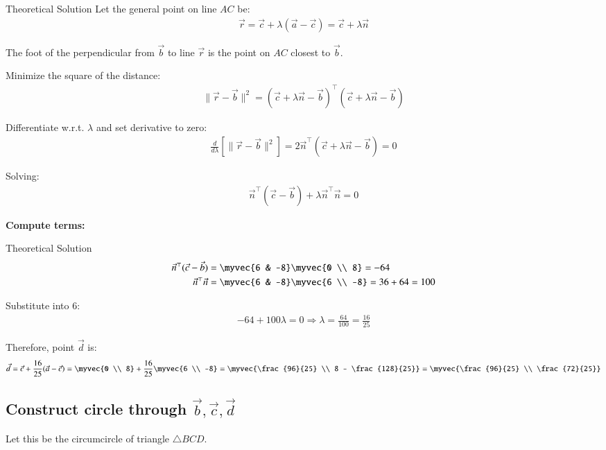 \documentclass{beamer}
\begin{document}
\begin{frame}{Theoretical Solution}
Let the general point on line \(AC\) be:
\begin{align}
\vec{r} = \vec{c} + \lambda(\vec{a} - \vec{c}) = \vec{c} + \lambda \vec{n} \label{3}
\end{align}

The foot of the perpendicular from \( \vec{b} \) to line \( \vec{r} \) is the point on \(AC\) closest to \(\vec{b}\).

Minimize the square of the distance:
\begin{align}
\| \vec{r} - \vec{b} \|^2 = (\vec{c} + \lambda \vec{n} - \vec{b})^\top (\vec{c} + \lambda \vec{n} - \vec{b}) \label{4}
\end{align}

Differentiate w.r.t. \(\lambda\) and set derivative to zero:
\begin{align}
\frac{d}{d\lambda} \left[ \| \vec{r} - \vec{b} \|^2 \right] = 2\vec{n}^\top (\vec{c} + \lambda \vec{n} - \vec{b}) = 0 \label{5}
\end{align}

Solving:
\begin{align}
\vec{n}^\top (\vec{c} - \vec{b}) + \lambda \vec{n}^\top \vec{n} = 0 \label{6}
\end{align}

\textbf{Compute terms:}






\end{frame}
\begin{frame}{Theoretical Solution}
\begin{align}
\vec{n}^\top (\vec{c} - \vec{b}) &= \myvec{6 & -8} \myvec{0 \\ 8} = -64 \label{7} \\
\vec{n}^\top \vec{n} &= \myvec{6 & -8} \myvec{6 \\ -8} = 36 + 64 = 100 \label{8}
\end{align}

Substitute into {6}:
\begin{align}
-64 + 100 \lambda = 0 \Rightarrow \lambda = \frac{64}{100} = \frac{16}{25} \label{9}
\end{align}

Therefore, point \(\vec{d}\) is:
\begin{align}
\vec{d} = \vec{c} + \frac{16}{25}(\vec{a} - \vec{c}) = \myvec{0 \\ 8} + \frac{16}{25} \myvec{6 \\ -8} = \myvec{\frac{96}{25} \\ 8 - \frac{128}{25}} = \myvec{\frac{96}{25} \\ \frac{72}{25}} \label{10}
\end{align}

\subsection*{Construct circle through \( \vec{b}, \vec{c}, \vec{d} \)}

Let this be the circumcircle of triangle \( \triangle BCD \).
\end{frame}
\end{document}
